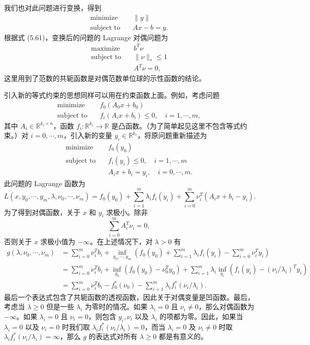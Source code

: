 \documentclass[UTF8, 12pt, fontset=fandol, oneside]{ctexart}
\begin{document}
我们也对此问题进行变换，得到
\[
\begin{aligned}
\text{minimize}\quad & \|y\|\\
\text{subject to}\quad & Ax-b=y.
\end{aligned}
\]
根据式 (5.61)，变换后的问题的 Lagrange 对偶问题为
\begin{equation}
\begin{aligned}
\text{maximize}\quad & b^T\nu\\
\text{subject to}\quad & \|\nu\|_\ast\leq 1\\
& A^T\nu=0,
\end{aligned}
\tag{5.64}
\end{equation}
这里用到了范数的共轭函数是对偶范数单位球的示性函数的结论。

引入新的等式约束的思想同样可以用在约束函数上面。例如，考虑问题
\begin{equation}
\begin{aligned}
\text{minimize}\quad & f_0(A_0x+b_0)\\
\text{subject to}\quad & f_i(A_ix+b_i)\leq 0,\quad i=1,\cdots,m,
\end{aligned}
\tag{5.65}
\end{equation}
其中 $A_i\in\mathbb{R}^{k_i\times n}$，函数 $f_i:\mathbb{R}^{k_i}\to\mathbb{R}$ 是凸函数。（为了简单起见这里不包含等式约束。）对 $i=0,\cdots,m$，引入新的变量 $y_i\in\mathbb{R}^{k_i}$，将原问题重新描述为
\begin{equation}
\begin{aligned}
\text{minimize}\quad & f_0(y_0)\\
\text{subject to}\quad & f_i(y_i)\leq 0,\quad i=1,\cdots,m\\
& A_ix+b_i=y_i,\quad i=0,\cdots,m.
\end{aligned}
\tag{5.66}
\end{equation}
此问题的 Lagrange 函数为
\[
L(x,y_0,\cdots,y_m,\lambda,\nu_0,\cdots,\nu_m)
=f_0(y_0)+\sum_{i=1}^m\lambda_i f_i(y_i)
+\sum_{i=0}^m\nu_i^T(A_ix+b_i-y_i).
\]
为了得到对偶函数，关于 $x$ 和 $y_i$ 求极小。除非
\[
\sum_{i=0}^m A_i^T\nu_i=0,
\]
否则关于 $x$ 求极小值为 $-\infty$。在上述情况下，对 $\lambda>0$ 有
\[
\begin{aligned}
g(\lambda,\nu_0,\cdots,\nu_m)
&=\sum_{i=0}^m\nu_i^Tb_i+\inf_{y_0,\cdots,y_m}
\left(f_0(y_0)+\sum_{i=1}^m\lambda_i f_i(y_i)-\sum_{i=0}^m\nu_i^Ty_i\right)\\
&=\sum_{i=0}^m\nu_i^Tb_i+\inf_{y_0}(f_0(y_0)-\nu_0^Ty_0)
+\sum_{i=1}^m\lambda_i\inf_{y_i}\left(f_i(y_i)-(\nu_i/\lambda_i)^Ty_i\right)\\
&=\sum_{i=0}^m\nu_i^Tb_i-f_0^\ast(\nu_0)-\sum_{i=1}^m\lambda_i f_i^\ast(\nu_i/\lambda_i).
\end{aligned}
\]
最后一个表达式包含了共轭函数的透视函数，因此关于对偶变量是凹函数。最后，考虑当 $\lambda\geq 0$ 但是一些 $\lambda_i$ 为零时的情况。如果 $\lambda_i=0$ 且 $\nu_i\neq 0$，那么对偶函数为 $-\infty$。如果 $\lambda_i=0$ 且 $\nu_i=0$，则包含 $y_i,\nu_i$ 以及 $\lambda_i$ 的项都为零。因此，如果当 $\lambda_i=0$ 以及 $\nu_i=0$ 时我们取 $\lambda_i f_i^\ast(\nu_i/\lambda_i)=0$，而当 $\lambda_i=0$ 及 $\nu_i\neq 0$ 时取 $\lambda_i f_i^\ast(\nu_i/\lambda_i)=\infty$，那么 $g$ 的表达式对所有 $\lambda\geq 0$ 都是有意义的。
\end{document}
